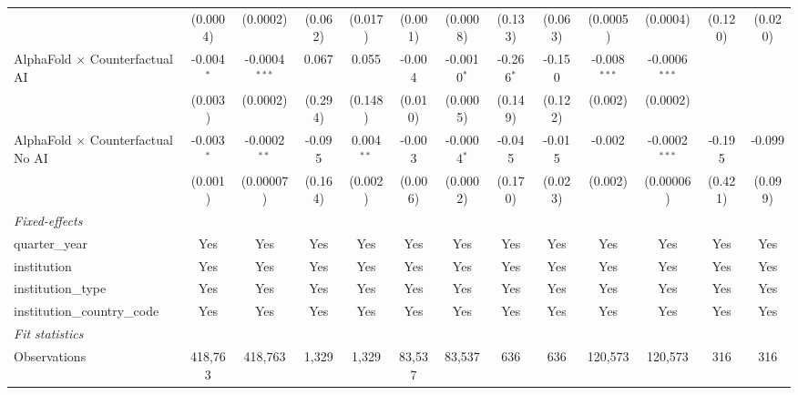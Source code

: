 \begin{tabular}{lcccccccccccc}
                                            & (0.0004)      & (0.0002)        & (0.062) & (0.017)       & (0.001)       & (0.0008)      & (0.133)      & (0.063) & (0.0005)       & (0.0004)        & (0.120) & (0.020)\\   
   AlphaFold $\times$ Counterfactual AI     & -0.004$^{*}$  & -0.0004$^{***}$ & 0.067   & 0.055         & -0.004        & -0.0010$^{*}$ & -0.266$^{*}$ & -0.150  & -0.008$^{***}$ & -0.0006$^{***}$ &         &   \\   
                                            & (0.003)       & (0.0002)        & (0.294) & (0.148)       & (0.010)       & (0.0005)      & (0.149)      & (0.122) & (0.002)        & (0.0002)        &         &   \\   
   AlphaFold $\times$ Counterfactual No AI  & -0.003$^{*}$  & -0.0002$^{**}$  & -0.095  & 0.004$^{**}$  & -0.003        & -0.0004$^{*}$ & -0.045       & -0.015  & -0.002         & -0.0002$^{***}$ & -0.195  & -0.099\\   
                                            & (0.001)       & (0.00007)       & (0.164) & (0.002)       & (0.006)       & (0.0002)      & (0.170)      & (0.023) & (0.002)        & (0.00006)       & (0.421) & (0.099)\\   
   \midrule
   \emph{Fixed-effects}\\
   quarter\_year                            & Yes           & Yes             & Yes     & Yes           & Yes           & Yes           & Yes          & Yes     & Yes            & Yes             & Yes     & Yes\\  
   institution                              & Yes           & Yes             & Yes     & Yes           & Yes           & Yes           & Yes          & Yes     & Yes            & Yes             & Yes     & Yes\\  
   institution\_type                        & Yes           & Yes             & Yes     & Yes           & Yes           & Yes           & Yes          & Yes     & Yes            & Yes             & Yes     & Yes\\  
   institution\_country\_code               & Yes           & Yes             & Yes     & Yes           & Yes           & Yes           & Yes          & Yes     & Yes            & Yes             & Yes     & Yes\\  
   \midrule
   \emph{Fit statistics}\\
   Observations                             & 418,763       & 418,763         & 1,329   & 1,329         & 83,537        & 83,537        & 636          & 636     & 120,573        & 120,573         & 316     & 316\\  

\end{tabular}
